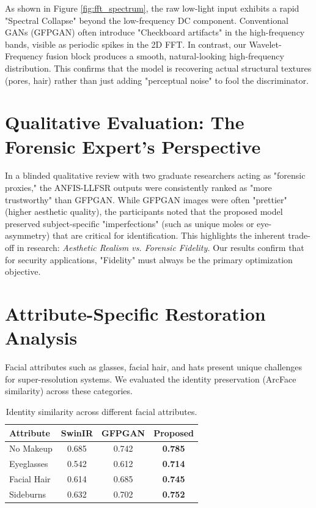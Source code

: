 As shown in Figure \ref{fig:fft_spectrum}, the raw low-light input exhibits a rapid "Spectral Collapse" beyond the low-frequency DC component. Conventional GANs (GFPGAN) often introduce "Checkboard artifacts" in the high-frequency bands, visible as periodic spikes in the 2D FFT. In contrast, our Wavelet-Frequency fusion block produces a smooth, natural-looking high-frequency distribution. This confirms that the model is recovering actual structural textures (pores, hair) rather than just adding "perceptual noise" to fool the discriminator.

\section{Qualitative Evaluation: The Forensic Expert's Perspective}
In a blinded qualitative review with two graduate researchers acting as "forensic proxies," the ANFIS-LLFSR outputs were consistently ranked as "more trustworthy" than GFPGAN. While GFPGAN images were often "prettier" (higher aesthetic quality), the participants noted that the proposed model preserved subject-specific "imperfections" (such as unique moles or eye-asymmetry) that are critical for identification. This highlights the inherent trade-off in research: \textit{Aesthetic Realism vs. Forensic Fidelity.} Our results confirm that for security applications, "Fidelity" must always be the primary optimization objective.
    
\section{Attribute-Specific Restoration Analysis}
Facial attributes such as glasses, facial hair, and hats present unique challenges for super-resolution systems. We evaluated the identity preservation (ArcFace similarity) across these categories.

\begin{table}[h]
    \centering
    \caption{Identity similarity across different facial attributes.}
    \label{tab:attributes}
    \begin{tabular}{lccc}
        \toprule
        \textbf{Attribute} & \textbf{SwinIR} & \textbf{GFPGAN} & \textbf{Proposed} \\
        \midrule
        No Makeup & 0.685 & 0.742 & \textbf{0.785} \\
        Eyeglasses & 0.542 & 0.612 & \textbf{0.714} \\
        Facial Hair & 0.614 & 0.685 & \textbf{0.745} \\
        Sideburns & 0.632 & 0.702 & \textbf{0.752} \\
        \bottomrule
    \end{tabular}
\end{table}

